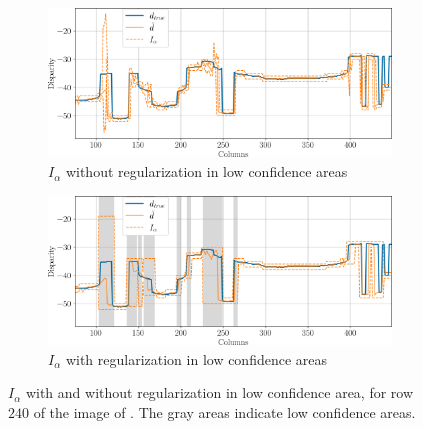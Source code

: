 \begin{figure}
    \centering
    \begin{subfigure}[t]{\linewidth}
        \centering
        \includegraphics[width=\linewidth]{Images/Chap_5/intervals_ambiguous_area_row_240_1.png}
        \caption{$I_\alpha$ without regularization in low confidence areas}
        \label{fig:intervals_ambiguous_row_240_1}
    \end{subfigure}\hfill
    \begin{subfigure}[t]{\linewidth}
        \centering
        \includegraphics[width=\linewidth]{Images/Chap_5/intervals_ambiguous_area_row_240_2.png}
        \caption{$I_\alpha$ with regularization in low confidence areas}
        \label{fig:intervals_ambiguous_row_240_2}
    \end{subfigure}
    \caption{$I_\alpha$ with and without regularization in low confidence area, for row $240$ of the image of . The gray areas indicate low confidence areas.}
    \label{fig:intervals_ambiguous_row_240}
\end{figure}

